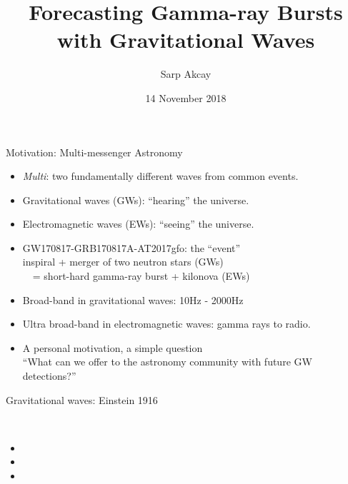 \documentclass[xcolor=dvipsnames,handout,t]{beamer}
\title[] %
\title[Forecasting GRBs w/ GWs] %
{Forecasting Gamma-ray Bursts with Gravitational Waves}
\author[Sarp Akcay]{Sarp Akcay\inst{1}\inst{2} }
\institute[FSU Jena - UCD] %
{
  \inst{1}%
  FSU Jena %
  \inst{2}%
  University College Dublin
  }
\date[Sabanci University]{14 November 2018}
\begin{document}
\begin{frame}
 \titlepage
\end{frame}



\begin{frame}{Motivation: Multi-messenger Astronomy}
\begin{itemize}
 \item \emph{Multi}: two fundamentally different waves from common events.
 \item[]\quad Gravitational waves (GWs): ``hearing''  the universe.
 \item[]\quad Electromagnetic waves (EWs): ``seeing'' the universe.
 \item GW170817-GRB170817A-AT2017gfo: the ``event'' \\
 \quad inspiral + merger of two neutron stars (GWs) \\
 \ \ = short-hard gamma-ray burst + kilonova (EWs)
 \item[] Broad-band in gravitational waves: 10Hz - 2000Hz
 \item[] Ultra broad-band in electromagnetic waves: gamma rays to radio.
 \item A personal motivation, a simple question \\
{\small ``What can we offer to the astronomy community with future GW detections?''}
 \end{itemize}


 \end{frame}

 
\begin{frame}{Gravitational waves: Einstein 1916}
  \begin{center}
        \\
         \end{center}
          \begin{itemize}
 \item  {}
 \item  {} %
  \item {}
 \end{itemize}
\end{frame}
\end{document}
